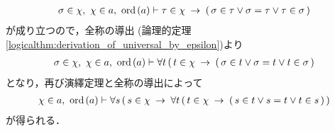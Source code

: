 \begin{sketch}
\begin{description}
\begin{align}
					\sigma \in \chi,\ \chi \in a,\ \operatorname*{ord}\hspace{0.15em}(a) \vdash 
					\tau \in \chi \hspace{0.25em}\rightarrow\hspace{0.25em} (\, \sigma \in \tau \vee \sigma = \tau \vee \tau \in \sigma\, )
				\end{align}
				が成り立つので，全称の導出
				(論理的定理\ref{logicalthm:derivation_of_universal_by_epsilon})より
				\begin{align}
					\sigma \in \chi,\ \chi \in a,\ \operatorname*{ord}\hspace{0.15em}(a) \vdash 
					\forall t\, (\, t \in \chi \hspace{0.25em}\rightarrow\hspace{0.25em} (\, \sigma \in t \vee \sigma = t \vee t \in \sigma\, )
				\end{align}
				となり，再び演繹定理と全称の導出によって
				\begin{align}
					\chi \in a,\ \operatorname*{ord}\hspace{0.15em}(a) \vdash 
					\forall s\, (\, s \in \chi \hspace{0.25em}\rightarrow\hspace{0.25em} \forall t\, (\, t \in \chi \hspace{0.25em}\rightarrow\hspace{0.25em} (\, s \in t \vee s = t \vee t \in s\, )\, )
				\end{align}
				が得られる．
				

\end{description}
\end{sketch}

